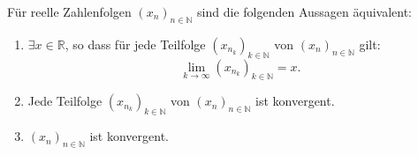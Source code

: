 Für reelle Zahlenfolgen $(x_n)_{n \in \mathbb{N}}$ sind die folgenden Aussagen äquivalent:
\begin{enumerate}
    \item $\exists x \in \mathbb{R}$, so dass für jede Teilfolge $(x_{n_k})_{k \in \mathbb{N}}$ von $(x_n)_{n \in \mathbb{N}}$ gilt:
    $$\lim_{k \to \infty} (x_{n_k})_{k \in \mathbb{N}} = x.$$
    \item Jede Teilfolge $(x_{n_k})_{k \in \mathbb{N}}$ von $(x_n)_{n \in \mathbb{N}}$ ist konvergent.
    \item $(x_n)_{n \in \mathbb{N}}$ ist konvergent.
\end{enumerate} 